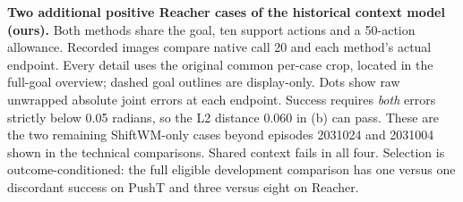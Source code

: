 \textbf{Two additional positive Reacher cases of the historical context model (ours).} Both methods share the goal, ten support actions and a 50-action allowance. Recorded images compare native call 20 and each method's actual endpoint. Every detail uses the original common per-case crop, located in the full-goal overview; dashed goal outlines are display-only. Dots show raw unwrapped absolute joint errors at each endpoint. Success requires \emph{both} errors strictly below 0.05 radians, so the L2 distance 0.060 in (b) can pass. These are the two remaining ShiftWM-only cases beyond episodes 2031024 and 2031004 shown in the technical comparisons. Shared context fails in all four. Selection is outcome-conditioned: the full eligible development comparison has one versus one discordant success on PushT and three versus eight on Reacher.
